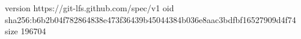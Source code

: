 version https://git-lfs.github.com/spec/v1
oid sha256:b6b2b04f782864838e473f36439b45044384b036e8aac3bdfbf16527909d4f74
size 196704
